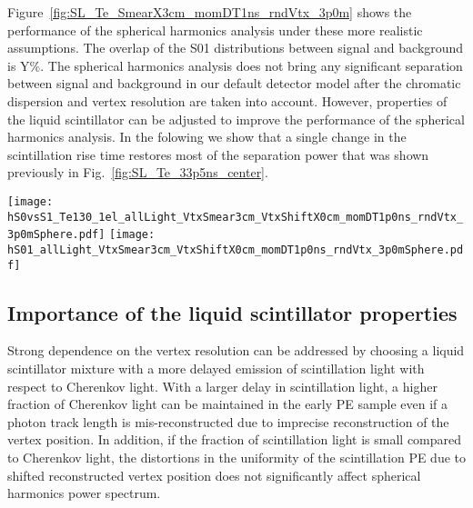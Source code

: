 Figure~\ref{fig:SL_Te_SmearX3cm_momDT1ns_rndVtx_3p0m} shows the performance of the spherical harmonics analysis under these more realistic 
assumptions. The overlap of the S01 distributions between signal and background is Y\%. The spherical harmonics analysis
does not bring any significant separation between signal and background in our default detector model after the chromatic dispersion and
vertex resolution are taken into account. However, properties of the liquid scintillator can be adjusted to improve 
the performance of the spherical harmonics analysis. In the folowing we show that a single change in the scintillation rise time
restores most of the separation power that was shown previously in Fig.~\ref{fig:SL_Te_33p5ns_center}.



\begin{figure*}[h]
  \centering
  \texttt{[image: hS0vsS1\_Te130\_1el\_allLight\_VtxSmear3cm\_VtxShiftX0cm\_momDT1p0ns\_rndVtx\_3p0mSphere.pdf]}
  \texttt{[image: hS01\_allLight\_VtxSmear3cm\_VtxShiftX0cm\_momDT1p0ns\_rndVtx\_3p0mSphere.pdf]}
  \caption{\emph{Left:} Scatter plot of $S_0$ versus $S_1$ for a simulation of 1000 signal (\emph{red crosses}) and background
    (\emph{blue triangles}) events. Event verticies are uniformly distributed within the fiducial volume, $R<3$~m.
    Vertex is smeared with 3~cm resolution. Differential cut of
    $\Delta t=t^{phot}_{measured} - t^{phot}_{predicted}<$1~ns is applied to select early PE sample.
    The default QE and 100\% photo-coverage is used in the simulation.
    Black dashed line corresponds to a linear fit to define 1-D variable $S_{01}$ (see text for details).
    \emph{Right:} Comparison of the $S_{01}$ distribution between signal (\emph{red solid line}) and background (\emph{blue dashed line}).}
\label{fig:SL_Te_SmearX3cm_momDT1ns_rndVtx_3p0m}
\end{figure*}



\subsection{Importance of the liquid scintillator properties}
Strong dependence on the vertex resolution can be addressed by choosing a liquid scintillator mixture with a more delayed emission 
of scintillation light with respect to Cherenkov light. With a larger delay in scintillation light, a higher fraction of Cherenkov light 
can be maintained in the early PE sample even if a photon track length is mis-reconstructed due to imprecise reconstruction of the vertex 
position. In addition, if the fraction of scintillation light is small compared to Cherenkov light, the distortions in the uniformity of 
the scintillation PE due to shifted reconstructed vertex position does not significantly affect spherical harmonics power spectrum.

